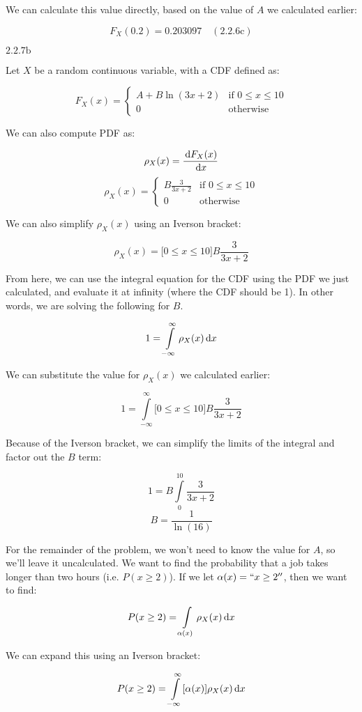 \documentclass{article}
\newcommand{\problem}[2]{$\boxed{\text{#1.#2}}$}
\newcommand{\solution}[3]{\boxed{#3\quad(\text{#1.#2})}}
\renewcommand{\d}[1]{\,\textnormal{d}#1}
\newcommand{\dd}[2]{\frac{\d{#1}}{\d{#2}}}
\begin{document}
We can calculate this value directly, based on the value of $A$ we
calculated earlier:

\[
\solution{2.2}{6c}{F_X(0.2)=0.203097}
\]

%
\problem{2.2}{7b}

Let $X$ be a random continuous variable, with a CDF defined as:

\[
F_X(x)=\begin{cases}A+B\ln(3x+2) & \text{if $0\le{}x\le10$} \\ 0 & \text{otherwise}\end{cases}
\]

We can also compute PDF as:

\[
\rho_X(x)=\dd{F_X(x)}{x}
\] \[
\rho_X(x)=\begin{cases}B\frac{3}{3x+2} & \text{if $0\le{}x\le10$} \\ 0 & \text{otherwise}\end{cases}
\]

We can also simplify $\rho_X(x)$ using an Iverson bracket:

\[
\rho_X(x)=\lbrack0\le x\le 10\rbrack B\frac{3}{3x+2}
\]


From here, we can use the integral equation for the CDF using the PDF
we just calculated, and evaluate it at infinity (where the CDF should
be 1). In other words, we are solving the following for $B$.

\[
1=\int\limits_{-\infty}^\infty\rho_X(x)\d{x}
\]

We can substitute the value for $\rho_X(x)$ we calculated earlier:

\[
1=\int\limits_{-\infty}^\infty \lbrack0\le x\le 10\rbrack B\frac{3}{3x+2}
\]

Because of the Iverson bracket, we can simplify the limits of the
integral and factor out the $B$ term:

\[
1=B\int\limits_{0}^{10}\frac{3}{3x+2}
\] \[
B=\frac{1}{\ln(16)}
\]

For the remainder of the problem, we won't need to know the value for
$A$, so we'll leave it uncalculated. We want to find the probability
that a job takes longer than two hours (i.e. $P(x\ge2)$). If we let
$\alpha(x)=``x\ge2''$, then we want to find:

\[
P(x\ge2)=\int\limits_{\alpha(x)}\rho_X(x)\d{x}
\]

We can expand this using an Iverson bracket:

\[
P(x\ge2)=\int\limits_{-\infty}^\infty\lbrack\alpha(x)\rbrack\rho_X(x)\d{x}
\]
\end{document}
